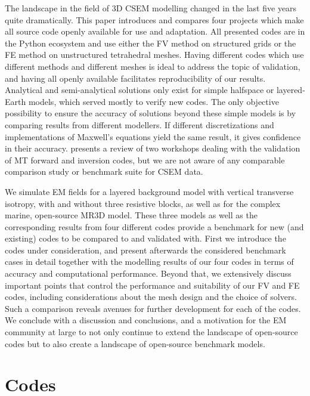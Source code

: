 \documentclass[extra, camera,%
]{gji}
\begin{document}
The landscape in the field of 3D CSEM modelling changed in the last five years quite dramatically. This paper introduces and compares four projects which make all source code openly available for use and adaptation. All presented codes are in the Python ecosystem and use either the FV method on structured grids or the FE method on unstructured tetrahedral meshes. Having different codes which use different methods and different meshes is ideal to address the topic of validation, and having all openly available facilitates reproducibility of our results. Analytical and semi-analytical solutions only exist for simple halfspace or layered-Earth models, which served mostly to verify new codes. The only objective possibility to ensure the accuracy of solutions beyond these simple models is by comparing results from different modellers. If different discretizations and implementations of Maxwell's equations yield the same result, it gives confidence in their accuracy. \cite{GJI.13.Miensopust} presents a review of two workshops dealing with the validation of MT forward and inversion codes, but we are not aware of any comparable comparison study or benchmark suite for CSEM data.

We simulate EM fields for a layered background model with vertical transverse isotropy, with and without three resistive blocks, as well as for the complex marine, open-source MR3D model. These three models as well as the corresponding results from four different codes provide a benchmark for new (and existing) codes to be compared to and validated with. First we introduce the codes under consideration, and present afterwards the considered benchmark cases in detail together with the modelling results of our four codes in terms of accuracy and computational performance. Beyond that, we extensively discuss important points that control the performance and suitability of our FV and FE codes, including considerations about the mesh design and the choice of solvers. Such a comparison reveals avenues for further development for each of the codes. We conclude with a discussion and conclusions, and a motivation for the EM community at large to not only continue to extend the landscape of open-source codes but to also create a landscape of open-source benchmark models.

\section{Codes}
\end{document}
